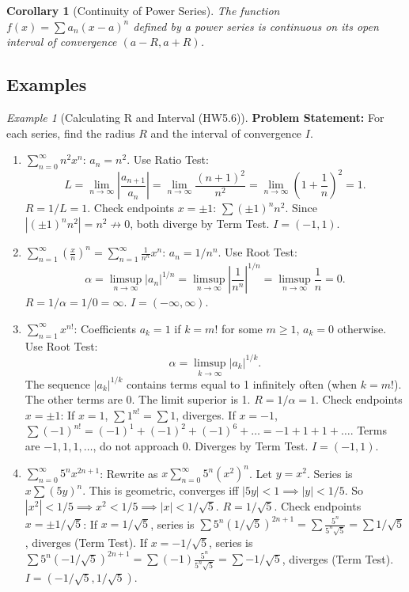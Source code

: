 \documentclass{article}
\theoremstyle{definition}
\theoremstyle{plain}
\newtheorem{corollary}[theorem]{Corollary}
\theoremstyle{remark}
\newtheorem{example}{Example}[section]
\begin{document}
\begin{corollary}[Continuity of Power Series]
The function \(f(x) = \sum a_n (x-a)^n\) defined by a power series is continuous on its open interval of convergence \((a-R, a+R)\).
\end{corollary}

\subsection{Examples}

\begin{example}[Calculating R and Interval (HW5.6)]
\textbf{Problem Statement:} For each series, find the radius \(R\) and the interval of convergence \(I\).
\begin{enumerate}
    \item \(\sum_{n=0}^\infty n^2 x^n\): \(a_n=n^2\). Use Ratio Test:
    \[ L = \lim_{n\to\infty} \left| \frac{a_{n+1}}{a_n} \right| = \lim_{n\to\infty} \frac{(n+1)^2}{n^2} = \lim_{n\to\infty} \left(1 + \frac{1}{n}\right)^2 = 1. \]
    \(R = 1/L = 1\). Check endpoints \(x=\pm 1\): \(\sum (\pm 1)^n n^2\). Since \(|(\pm 1)^n n^2| = n^2 \not\to 0\), both diverge by Term Test. \(I = (-1, 1)\).
    \item \(\sum_{n=1}^\infty \left(\frac{x}{n}\right)^n = \sum_{n=1}^\infty \frac{1}{n^n} x^n\): \(a_n=1/n^n\). Use Root Test:
    \[ \alpha = \limsup_{n\to\infty} |a_n|^{1/n} = \limsup_{n\to\infty} \left|\frac{1}{n^n}\right|^{1/n} = \limsup_{n\to\infty} \frac{1}{n} = 0. \]
    \(R = 1/\alpha = 1/0 = \infty\). \(I = (-\infty, \infty)\).
    \item \(\sum_{n=1}^\infty x^{n!}\): Coefficients \(a_k=1\) if \(k=m!\) for some \(m\ge 1\), \(a_k=0\) otherwise. Use Root Test:
    \[ \alpha = \limsup_{k\to\infty} |a_k|^{1/k}. \]
    The sequence \(|a_k|^{1/k}\) contains terms equal to 1 infinitely often (when \(k=m!\)). The other terms are 0. The limit superior is 1.
    \(R = 1/\alpha = 1\). Check endpoints \(x=\pm 1\):
    If \(x=1\), \(\sum 1^{n!} = \sum 1\), diverges.
    If \(x=-1\), \(\sum (-1)^{n!} = (-1)^1 + (-1)^2 + (-1)^6 + \dots = -1 + 1 + 1 + \dots\). Terms are \(-1, 1, 1, \dots\), do not approach 0. Diverges by Term Test.
    \(I = (-1, 1)\).
    \item \(\sum_{n=0}^\infty 5^n x^{2n+1}\): Rewrite as \(x \sum_{n=0}^\infty 5^n (x^2)^n\). Let \(y=x^2\). Series is \(x \sum (5y)^n\). This is geometric, converges iff \(|5y|<1 \implies |y|<1/5\). So \(|x^2|<1/5 \implies x^2<1/5 \implies |x|<1/\sqrt{5}\).
    \(R = 1/\sqrt{5}\). Check endpoints \(x=\pm 1/\sqrt{5}\):
    If \(x=1/\sqrt{5}\), series is \(\sum 5^n (1/\sqrt{5})^{2n+1} = \sum \frac{5^n}{5^n \sqrt{5}} = \sum 1/\sqrt{5}\), diverges (Term Test).
    If \(x=-1/\sqrt{5}\), series is \(\sum 5^n (-1/\sqrt{5})^{2n+1} = \sum (-1) \frac{5^n}{5^n \sqrt{5}} = \sum -1/\sqrt{5}\), diverges (Term Test).
    \(I = (-1/\sqrt{5}, 1/\sqrt{5})\).
\end{enumerate}
\end{example}
\end{document}
